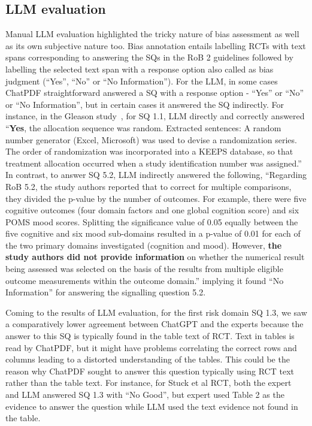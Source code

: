 \documentclass[sn-mathphys,Numbered]{sn-jnl}%
\theoremstyle{thmstyleone}%
\theoremstyle{thmstyletwo}%
\theoremstyle{thmstylethree}%
\begin{document}
\subsection{LLM evaluation}
\label{disc:llm}
%
Manual LLM evaluation highlighted the tricky nature of bias assessment as well as its own subjective nature too.
Bias annotation entails labelling RCTs with text spans corresponding to answering the SQs in the RoB 2 guidelines followed by labelling the selected text span with a response option also called as bias judgment (``Yes'', ``No'' or ``No Information'').
For the LLM, in some cases ChatPDF straightforward answered a SQ with a response option - ``Yes'' or ``No'' or ``No Information'', but in certain cases it answered the SQ indirectly.
For instance, in the Gleason study~\cite{gleason2015effects}, for SQ 1.1, LLM directly and correctly answered ``\textbf{Yes}, the allocation sequence was random. Extracted sentences: A random number generator (Excel, Microsoft) was used to devise a randomization series. The order of randomization was incorporated into a KEEPS database, so that treatment allocation occurred when a study identification number was assigned.''
In contrast, to answer SQ 5.2, LLM indirectly answered the following, ``Regarding RoB 5.2, the study authors reported that to correct for multiple comparisons, they divided the p-value by the number of outcomes. For example, there were five cognitive outcomes (four domain factors and one global cognition score) and six POMS mood scores. Splitting the significance value of 0.05 equally between the five cognitive and six mood sub-domains resulted in a p-value of 0.01 for each of the two primary domains investigated (cognition and mood). However, \textbf{the study authors did not provide information} on whether the numerical result being assessed was selected on the basis of the results from multiple eligible outcome measurements within the outcome domain.'' implying it found ``No Information'' for answering the signalling question 5.2.



Coming to the results of LLM evaluation, for the first risk domain SQ 1.3, we saw a comparatively lower agreement between ChatGPT and the experts because the answer to this SQ is typically found in the table text of RCT.
Text in tables is read by ChatPDF, but it might have problems correlating the correct rows and columns leading to a distorted understanding of the tables.
This could be the reason why ChatPDF sought to answer this question typically using RCT text rather than the table text.
For instance, for Stuck et al RCT, both the expert and LLM answered SQ 1.3 with ``No Good'', but expert used Table 2 as the evidence to answer the question while LLM used the text evidence not found in the table.
\end{document}
